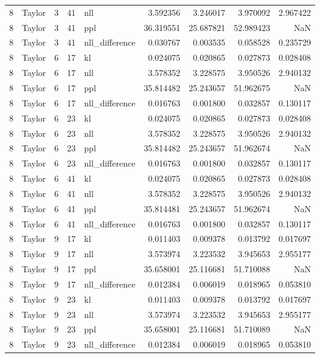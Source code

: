 \begin{tabular}{rlrrlrrrr}
8 & Taylor & 3 & 41 & nll & 3.592356 & 3.246017 & 3.970092 & 2.967422 \\
8 & Taylor & 3 & 41 & ppl & 36.319551 & 25.687821 & 52.989423 & NaN \\
8 & Taylor & 3 & 41 & nll_difference & 0.030767 & 0.003535 & 0.058528 & 0.235729 \\
8 & Taylor & 6 & 17 & kl & 0.024075 & 0.020865 & 0.027873 & 0.028408 \\
8 & Taylor & 6 & 17 & nll & 3.578352 & 3.228575 & 3.950526 & 2.940132 \\
8 & Taylor & 6 & 17 & ppl & 35.814482 & 25.243657 & 51.962675 & NaN \\
8 & Taylor & 6 & 17 & nll_difference & 0.016763 & 0.001800 & 0.032857 & 0.130117 \\
8 & Taylor & 6 & 23 & kl & 0.024075 & 0.020865 & 0.027873 & 0.028408 \\
8 & Taylor & 6 & 23 & nll & 3.578352 & 3.228575 & 3.950526 & 2.940132 \\
8 & Taylor & 6 & 23 & ppl & 35.814482 & 25.243657 & 51.962674 & NaN \\
8 & Taylor & 6 & 23 & nll_difference & 0.016763 & 0.001800 & 0.032857 & 0.130117 \\
8 & Taylor & 6 & 41 & kl & 0.024075 & 0.020865 & 0.027873 & 0.028408 \\
8 & Taylor & 6 & 41 & nll & 3.578352 & 3.228575 & 3.950526 & 2.940132 \\
8 & Taylor & 6 & 41 & ppl & 35.814481 & 25.243657 & 51.962674 & NaN \\
8 & Taylor & 6 & 41 & nll_difference & 0.016763 & 0.001800 & 0.032857 & 0.130117 \\
8 & Taylor & 9 & 17 & kl & 0.011403 & 0.009378 & 0.013792 & 0.017697 \\
8 & Taylor & 9 & 17 & nll & 3.573974 & 3.223532 & 3.945653 & 2.955177 \\
8 & Taylor & 9 & 17 & ppl & 35.658001 & 25.116681 & 51.710088 & NaN \\
8 & Taylor & 9 & 17 & nll_difference & 0.012384 & 0.006019 & 0.018965 & 0.053810 \\
8 & Taylor & 9 & 23 & kl & 0.011403 & 0.009378 & 0.013792 & 0.017697 \\
8 & Taylor & 9 & 23 & nll & 3.573974 & 3.223532 & 3.945653 & 2.955177 \\
8 & Taylor & 9 & 23 & ppl & 35.658001 & 25.116681 & 51.710089 & NaN \\
8 & Taylor & 9 & 23 & nll_difference & 0.012384 & 0.006019 & 0.018965 & 0.053810 \\

\end{tabular}
